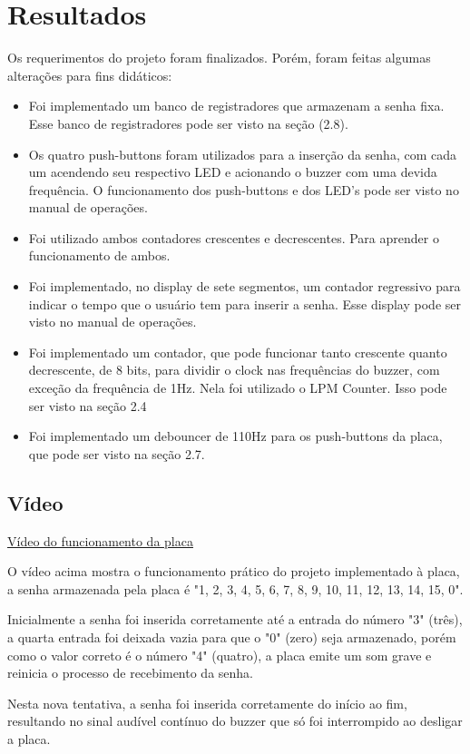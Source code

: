 
\chapter{Resultados}\label{cap_4_Classificacao}

Os requerimentos do projeto foram finalizados. Porém, foram feitas algumas alterações para fins didáticos:

\begin{itemize}
    \item Foi implementado um banco de registradores que armazenam a senha fixa. Esse banco de registradores pode ser visto na seção (2.8).
    \item Os quatro push-buttons foram utilizados para a inserção da senha, com cada um acendendo seu respectivo LED e acionando o buzzer com uma devida frequência. O funcionamento dos push-buttons e dos LED's pode ser visto no manual de operações.
    \item Foi utilizado ambos contadores crescentes e decrescentes. Para aprender o funcionamento de ambos.
    \item Foi implementado, no display de sete segmentos, um contador regressivo para indicar o tempo que o usuário tem para inserir a senha. Esse display pode ser visto no manual de operações.
    \item Foi implementado um contador, que pode funcionar tanto crescente quanto decrescente, de 8 bits, para dividir o clock nas frequências do buzzer, com exceção da frequência de 1Hz. Nela foi utilizado o LPM Counter. Isso pode ser visto na seção 2.4
    \item Foi implementado um debouncer de 110Hz para os push-buttons da placa, que pode ser visto na seção 2.7.
\end{itemize}

\section{Vídeo}

\href{https://drive.google.com/file/d/1tNwCKX1g5BIK9-MFe4KzjO6rrqYe75fk/view?usp=sharing}{Vídeo do funcionamento da placa}

O vídeo acima mostra o funcionamento prático do projeto implementado à placa, a senha armazenada pela placa é "1, 2, 3, 4, 5, 6, 7, 8, 9, 10, 11, 12, 13, 14, 15, 0".

Inicialmente a senha foi inserida corretamente até a entrada do número "3" (três), a quarta entrada foi deixada vazia para que o "0" (zero) seja armazenado, porém como o valor correto é o número "4" (quatro), a placa emite um som grave e reinicia o processo de recebimento da senha.

Nesta nova tentativa, a senha foi inserida corretamente do início ao fim, resultando no sinal audível contínuo do buzzer que só foi interrompido ao desligar a placa.